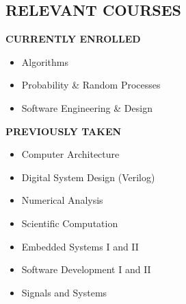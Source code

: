 \documentclass[margin]{res}
\begin{document}
\begin{resume}
  \section{RELEVANT COURSES}
  \vspace{-.125em}
  {\footnotesize\textbf{CURRENTLY ENROLLED}}
  \vspace{-.75em}
  \begin{multicols}{2}
    \begin{itemize}
      \item Algorithms
      \item Probability \& Random Processes
      \item Software Engineering \& Design
    \end{itemize}
  \end{multicols}
  \vspace{-1.5em}
  {\footnotesize\textbf{PREVIOUSLY TAKEN}}
  \vspace{-.75em}
  \begin{multicols}{2}
    \begin{itemize}
    \item Computer Architecture
    \item Digital System Design (Verilog)
    \item Numerical Analysis
    \item Scientific Computation
    \item Embedded Systems I and II
    \item Software Development I and II
    \item Signals and Systems
    \end{itemize}
  \end{multicols}


\end{resume}
\end{document}
